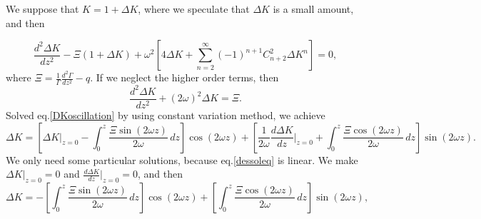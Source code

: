 \documentclass[
 jor,
 amsmath,amssymb,preprint,
]{revtex4-2}
\begin{document}
We suppose that $K=1+\Delta K$, where we speculate that $\Delta K$ is a small amount, and then
\begin{comment}
\begin{equation}
    \frac{d^2 \Delta K}{d z^2}-\left(\frac{1}{\Gamma}\frac{d^2\Gamma}{d z^2}-q\right)(1+\Delta K)+\omega^2(1+\Delta K)\sum_{n=1}^{\infty}(-1)^{n+1}\frac{(n+3)!}{n!3!}{(\Delta K)}^n=0.
\end{equation}
\end{comment}
\begin{comment}
\begin{equation}
    \frac{d^2 \Delta K}{d z^2}-\left(\frac{1}{\Gamma}\frac{d^2\Gamma}{d z^2}-q\right)(1+\Delta K)+\omega^2(1+\Delta K)\sum_{n=0}^{\infty}(-1)^{n+1}C^3_{n+3}{(\Delta K)}^n=0,
\end{equation}
\end{comment}
\begin{comment}
\begin{equation}
    \frac{d^2 \Delta K}{d z^2}-\left(\frac{1}{\Gamma}\frac{d^2\Gamma}{d z^2}-q\right)(1+\Delta K)+\omega^2[4\Delta K+\sum_{n=1}^{\infty}((-1)^{n+1}(C^3_{n+3}-C^3_{n+4})){(\Delta K)}^{n+1}]=0.
\end{equation}
\end{comment}
\begin{equation}
    \frac{d^2 \Delta K}{d z^2}-\Xi(1+\Delta K)+\omega^2\left[4\Delta K+\sum_{n=2}^{\infty}(-1)^{n+1}C^2_{n+2}{\Delta K}^n\right]=0,
\end{equation}
where $\Xi=\frac{1}{\Gamma}\frac{d^2\Gamma}{d z^2}-q$. 
If we neglect the higher order terms, then
\begin{equation}\label{DKoscillation}
    \frac{d^2 \Delta K}{d z^2}+(2\omega)^2\Delta K=\Xi.
\end{equation}
Solved eq.\eqref{DKoscillation} by using constant variation method, we achieve
\begin{equation}
    \Delta K=\left[\Delta K|_{z=0}-\int_{0}^z\frac{\Xi\sin(2\omega z)}{2\omega}\,d z\right]\cos(2\omega z)+\left[\frac{1}{2\omega}\frac{d \Delta K}{d z}|_{z=0}+\int_{0}^z\frac{\Xi\cos(2\omega z)}{2\omega}\,d z\right]\sin(2\omega z).
\end{equation}
We only need some particular solutions, because eq.\eqref{dessoleq} is linear. We make $\Delta K|_{z=0}=0$ and $\frac{d \Delta K}{d z}|_{z=0}=0$, and then
\begin{equation}
    \Delta K=-\left[\int_{0}^z\frac{\Xi\sin(2\omega z)}{2\omega}\,d z\right]\cos(2\omega z)+\left[\int_{0}^z\frac{\Xi\cos(2\omega z)}{2\omega}\,d z\right]\sin(2\omega z),
\end{equation}
\end{document}
